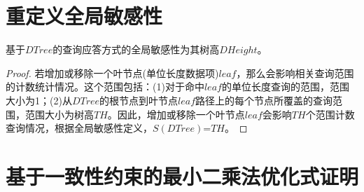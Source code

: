 \section{重定义全局敏感性}

\begin{prop}
	基于$DTree$的查询应答方式的全局敏感性为其树高$DHeight$。
\end{prop}
\begin{proof}
	若增加或移除一个叶节点(单位长度数据项)$leaf$，那么会影响相关查询范围的计数统计情况。这个范围包括：(1)对于命中$leaf$的单位长度查询的范围，范围大小为1；(2)从$DTree$的根节点到叶节点$leaf$路径上的每个节点所覆盖的查询范围，范围大小为树高$TH$。因此，增加或移除一个叶节点$leaf$会影响$TH$个范围计数查询情况，根据全局敏感性定义，$S(DTree)$=$TH$。
\end{proof}

\section{基于一致性约束的最小二乘法优化式证明}

